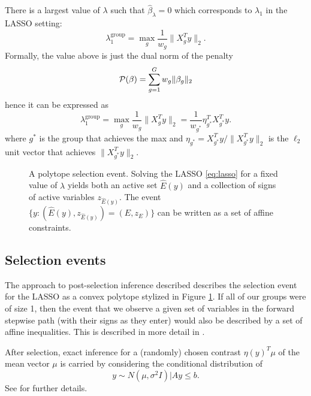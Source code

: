 \documentclass{imsart}
\begin{document}
There is a largest value of $\lambda$ such that $\hat{\beta}_{\lambda}=0$ which corresponds to $\lambda_1$
in the LASSO setting:
\begin{equation}
\label{eq:lammax}
\lambda_1^{\text{group}} = \max_{g} \frac{1}{w_g}\|X_g^Ty\|_2 . 
\end{equation}
Formally, the value above is just the dual norm of the penalty
$$
{\cal P}(\beta) = \sum_{g=1}^G w_g \| \beta_g \|_2
$$
hence it can be expressed as
\begin{equation}
\label{eq:lammax}
\lambda_1^{\text{group}} = \max_{g} \frac{1}{w_g}\|X_g^Ty\|_2 = \frac{1}{w_{g^*}}\eta_{g^*}^TX_{g^*}^Ty . 
\end{equation}
where $g^*$ is the group that achieves the max and 
$\eta_{g^*} = X_{g^*}^Ty / \|X_{g^*}^Ty\|_2$ is the $\ell_2$ unit vector that achieves $\|X_{g^*}^Ty\|_2$.



\begin{figure}
\label{fig:polytope}
\begin{center}
\resizebox{!}{3in}{}
\end{center}
A polytope selection event. Solving the LASSO \eqref{eq:lasso} for a fixed value
of $\lambda$ yields both an active set $\hat{E}(y)$ and a collection of signs of 
active variables $z_{\hat{E}(y)}$. The event $\{y: (\hat{E}(y), z_{\hat{E}(y)}) = (E, z_E)\}$
can be written as a set of affine constraints.
\end{figure}

\subsection{Selection events}

The approach to post-selection inference described \cite{lasso:fixed}
describes the selection event for the LASSO as a convex polytope stylized
in Figure \ref{fig:polytope}. If all of our groups were of size 1, then
the event that we observe a given set of variables
in the forward stepwise path (with their signs as they enter) would also
be described by a set of affine inequalities. This is described in more detail in \cite{exact:lars}.

After selection, exact inference for a (randomly) chosen contrast $\eta(y)^T\mu$ of the mean vector
$\mu$ is carried by considering the conditional distribution of 
\begin{equation}
y \sim N(\mu, \sigma^2 I) \bigl| Ay \leq b.
\end{equation}
See \cite{lasso:fixed,exact:lars} for further details.
\end{document}

